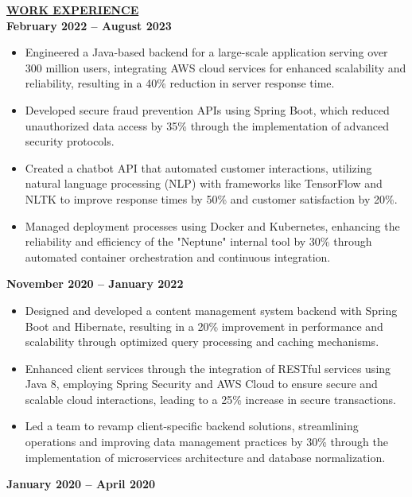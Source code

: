\documentclass{article}
\begin{document}
\noindent \textbf{\underline{WORK EXPERIENCE}} \\
 \hfill \textbf{February 2022 – August 2023}
\begin{itemize}[noitemsep,nolistsep,leftmargin=*]
    \item Engineered a Java-based backend for a large-scale application serving over 300 million users, integrating AWS cloud services for enhanced scalability and reliability, resulting in a 40\% reduction in server response time. 
    \item Developed secure fraud prevention APIs using Spring Boot, which reduced unauthorized data access by 35\% through the implementation of advanced security protocols. 
    \item Created a chatbot API that automated customer interactions, utilizing natural language processing (NLP) with frameworks like TensorFlow and NLTK to improve response times by 50\% and customer satisfaction by 20\%. 
    \item Managed deployment processes using Docker and Kubernetes, enhancing the reliability and efficiency of the "Neptune" internal tool by 30\% through automated container orchestration and continuous integration. 
\end{itemize}
\vspace{1mm}
 \hfill \textbf{November 2020 – January 2022}
\begin{itemize}[noitemsep,nolistsep,leftmargin=*]
    \item Designed and developed a content management system backend with Spring Boot and Hibernate, resulting in a 20\% improvement in performance and scalability through optimized query processing and caching mechanisms. 
    \item Enhanced client services through the integration of RESTful services using Java 8, employing Spring Security and AWS Cloud to ensure secure and scalable cloud interactions, leading to a 25\% increase in secure transactions. 
    \item Led a team to revamp client-specific backend solutions, streamlining operations and improving data management practices by 30\% through the implementation of microservices architecture and database normalization. 
\end{itemize}
\vspace{1mm}
 \hfill \textbf{January 2020 – April 2020}
\end{document}
